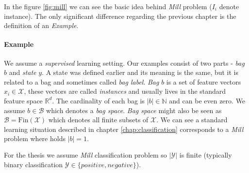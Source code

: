 In the figure \ref{fig:mill} we can see the basic idea behind \emph{Mill} problem ($I_i$ denote instance). The only significant difference regarding the previous chapter is the definition of an \emph{Example}. 
\paragraph{Example}
We assume a \emph{supervised} learning setting. Our examples consist of two parts - \emph{bag} $b$ and \emph{state} $y$. A state was defined earlier and its meaning is the same, but it is related to a bag and sometimes called \emph{bag label}. \emph{Bag} $b$ is a set of feature vectors $x_i\in\mathcal{X}$, these vectors are called \emph{instances} and usually lives in the standard feature space $\mathbb{R}^{d}$. The cardinality of each bag is $|b| \in \mathbb{N}$ and can be even zero. We assume $b \in \mathcal{B}$ which denotes a \emph{bag space}. \emph{Bag space} might also be seen as $\mathcal{B} = \mathrm{Fin}(\mathcal{X})$ which denotes all finite subsets of $\mathcal{X}$. We can see a standard learning situation described in chapter \ref{chap:classification} corresponds to a \emph{Mill} problem where holds $|b| = 1$.

For the thesis we assume \emph{Mill} classification problem so $|\mathcal{Y}|$ is finite (typically binary classification $\mathcal{Y} \in \{positive, negative\}$). 

